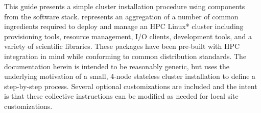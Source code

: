 This guide presents a simple cluster installation procedure using components
from the \OHPC{} software stack. \OHPC{} represents an aggregation of a number
of common ingredients required to deploy and manage an HPC Linux* cluster
including provisioning tools, resource management, I/O clients, development
tools, and a variety of scientific libraries. These packages have been
pre-built with HPC integration in mind while conforming to common \Linux{}
distribution standards.
The documentation herein is intended to
be reasonably generic, but uses the underlying motivation of a small, 4-node
stateless cluster installation to define a step-by-step process. Several
optional customizations are included and the intent is that these collective
instructions can be modified as needed for local site customizations.
